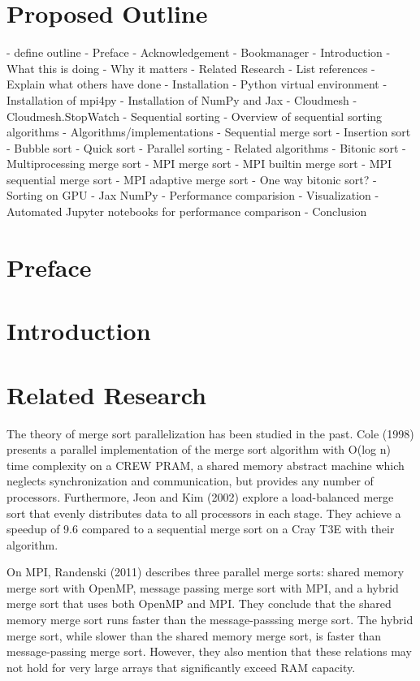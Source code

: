 \section{Proposed Outline}

- define outline
- Preface
    - Acknowledgement
    - Bookmanager
- Introduction
    - What this is doing
    - Why it matters
    - Related Research
        - List references
        - Explain what others have done
- Installation
    - Python virtual environment
    - Installation of mpi4py
    - Installation of NumPy and Jax
    - Cloudmesh
        - Cloudmesh.StopWatch
- Sequential sorting
    - Overview of sequential sorting algorithms
    - Algorithms/implementations
        - Sequential merge sort
        - Insertion sort
        - Bubble sort
        - Quick sort
- Parallel sorting
    - Related algorithms
        - Bitonic sort
    - Multiprocessing merge sort
    - MPI merge sort
        - MPI builtin merge sort
        - MPI sequential merge sort
        - MPI adaptive merge sort
            - One way bitonic sort?
- Sorting on GPU
    - Jax NumPy
- Performance comparision
- Visualization
    - Automated Jupyter notebooks for performance comparison
- Conclusion

\section{Preface}

\section{Introduction}

\section{Related Research}
The theory of merge sort parallelization has been studied in the past. Cole (1998) presents a parallel implementation of
the merge sort algorithm with O(log n) time complexity on a CREW PRAM, a shared memory abstract machine which neglects
synchronization and communication, but provides any number of processors. Furthermore, Jeon and Kim (2002) explore a
load-balanced merge sort that evenly distributes data to all processors in each stage. They achieve a speedup of 9.6
compared to a sequential merge sort on a Cray T3E with their algorithm.

On MPI, Randenski (2011) describes three parallel merge sorts: shared memory merge sort with OpenMP, message passing
merge sort with MPI, and a hybrid merge sort that uses both OpenMP and MPI. They conclude that the shared memory merge
sort runs faster than the message-passsing merge sort. The hybrid merge sort, while slower than the shared memory merge
sort, is faster than message-passing merge sort. However, they also mention that these relations may not hold for very
large arrays that significantly exceed RAM capacity.

